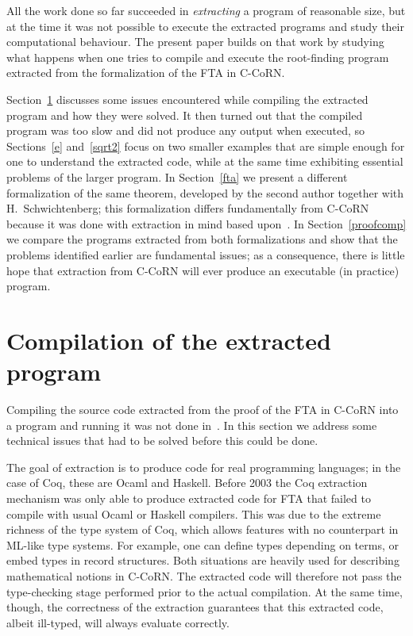 \documentclass{entcs}
\begin{document}
All the work done so far succeeded in
\emph{extracting} a program of reasonable size, but at the time it was not
possible to execute the extracted programs and study their
computational behaviour.  The present paper builds on that work by
studying what happens when one tries to compile and execute the root-finding
program extracted from the formalization of the FTA in C-CoRN.

Section~\ref{program} discusses some issues encountered while compiling
the extracted program and how they were solved.  It then turned out that
the compiled program was too slow and did not produce any output when
executed, so Sections~\ref{e} and~\ref{sqrt2} focus on two smaller examples
that are simple enough for one to understand the extracted code, while at
the same time exhibiting essential problems of the larger program.
In Section~\ref{fta} we present
a different formalization of the same theorem, developed
by the second author together with H.~Schwichtenberg; this
formalization differs fundamentally from C-CoRN because it was done
with extraction in mind based upon~\cite{sch:03}.
In Section~\ref{proofcomp} we compare the programs extracted from
both formalizations and show that
the problems identified earlier are fundamental issues; as a consequence,
there is little hope that extraction from C-CoRN will ever produce an
executable (in practice) program.  

\section{Compilation of the extracted program}\label{program}

Compiling the source code extracted from the proof of the FTA in C-CoRN
into a program and running it was not done in~\cite{lcf:spi:03}.  In this
section we address some technical issues that had to be
solved before this could be done.

The goal of extraction is to produce code for real programming
languages; in the case of Coq, these are Ocaml and Haskell.  Before
2003 the Coq extraction mechanism was only able to produce extracted
code for FTA that failed to compile with usual Ocaml or Haskell compilers.
This was due to the extreme richness of the type system of Coq, which
allows features with no counterpart in ML-like type systems. For
example, one can define types depending on terms, or embed types in  
record structures. Both situations are heavily used for describing 
mathematical notions in C-CoRN. 
The extracted code will therefore not pass the type-checking stage performed
prior to the actual compilation.  At the same time, though, the correctness
of the extraction guarantees that this extracted code, albeit
ill-typed, will always evaluate correctly.
\end{document}
